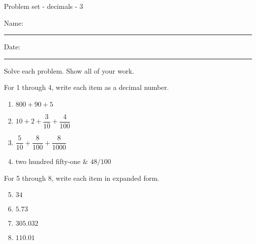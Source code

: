 \documentclass[12pt]{article}
\begin{document}
\pagestyle{empty} %
\begin{center}
          Problem set - decimals - 3 \\[0.5in]
\end{center}
Name: \rule{4in}{0.005in} Date: \rule{1.5in}{0.005in} 
  \vspace{0.25in}

Solve each problem. Show all of your work. 

For 1 through 4, write each item as a decimal number. 
\begin{multicols}{2}
\begin{enumerate}

    \item \hspace{0.250in} $800+90+5$
  \vspace{0.25in}

    \item \hspace{0.250in} $10+2+\dfrac{3}{10}+\dfrac{4}{100}$
  \vspace{0.25in}

    \item \hspace{0.250in} $\dfrac{5}{10}+\dfrac{8}{100}+\dfrac{8}{1000}$
  \vspace{0.25in}

    \item \hspace{0.250in} two hundred fifty-one \& $48/100$ 
  \vspace{0.25in}

\end{enumerate}
\end{multicols}
For 5 through 8, write each item in expanded form. 
\begin{multicols}{2}
\begin{enumerate}
\setcounter{enumi}{4}

\item \hspace{0.25in} $34$ 
  \vspace{0.25in}
  
\item \hspace{0.25in} $5.73$ 
  \vspace{0.25in}
  
\item \hspace{0.25in} $305.032$ 
  \vspace{0.25in}
  
\item \hspace{0.25in} $110.01$ 
  \vspace{0.25in}
  
\end{enumerate}
\end{multicols}
\end{document}
